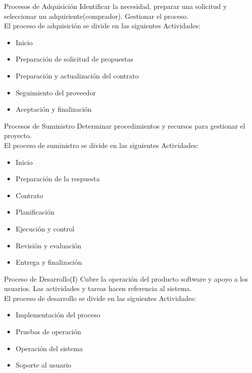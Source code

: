 \documentclass{beamer}
\begin{document}
			\begin{frame}{Procesos de Adquisición}
				Identificar la necesidad, preparar una solicitud y seleccionar un adquiriente(comprador). Gestionar el proceso.\\
				
				El proceso de adquisición se divide en las siguientes Actividades:\pause
				\begin{itemize}
					\item Inicio\pause
					\item Preparación de solicitud de propuestas\pause
					\item Preparación y actualización del contrato\pause
					\item Seguimiento del proveedor\pause
					\item Aceptación y finalización
				\end{itemize}
			\end{frame}
			
			\begin{frame}{Procesos de Suministro}
				Determinar procedimientos y recursos para gestionar el proyecto.\\
				
				El proceso de suministro se divide en las siguientes Actividades:\pause
				\begin{itemize}
					\item Inicio\pause
					\item Preparación de la respuesta\pause
					\item Contrato\pause
					\item Planificación\pause
					\item Ejecución y control\pause
					\item Revisión y evaluación\pause
					\item Entrega y finalización
				\end{itemize}
			\end{frame}
			
			\begin{frame}{Proceso de Desarrollo(I)}
				Cubre la operación del producto software y apoyo a los usuarios. Las actividades y tareas hacen referencia al sistema.\\
				El proceso de desarrollo se divide en las siguientes Actividades:\pause
				\begin{itemize}
					\item Implementación del proceso\pause
					\item Pruebas de operación\pause
					\item Operación del sistema\pause
					\item Soporte al usuario
				\end{itemize}
			\end{frame}
			
\end{document}
